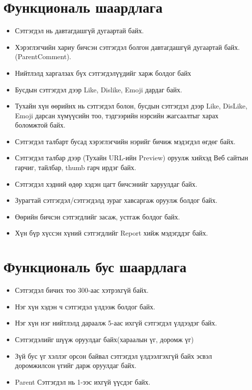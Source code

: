 \documentclass[12pt]{article}
\begin{document}
	\section{Функциональ шаардлага}	
	\begin{itemize}
		\item Сэтгэгдэл нь давтагдашгүй дугаартай байх.
		\item Хэрэглэгчийн хариу бичсэн сэтгэгдэл болгон давтагдашгүй дугаартай байх.(ParentComment).
		\item Нийтлэлд харгалзах бүх сэтгэгдэлүүдийг харж болдог байх
		\item Бусдын сэтгэгдэл дээр Like, Dislike, Emoji дардаг байх.
		\item Тухайн хүн өөрийнх нь сэтгэгдэл болон, бусдын сэтгэгдэл дээр Like, DisLike, Emoji дарсан хүмүүсийн тоо, тэдгээрийн нэрсийн жагсаалтыг харах боломжтой байх.
		\item Сэтгэгдэл талбарт бусад хэрэглэгчийн нэрийг бичиж мэдэгдэл өгдөг байх. 
		\item Сэтгэгдэл талбар дээр (Тухайн URL-ийн Preview) оруулж хийхэд Веб сайтын гарчиг, тайлбар, thumb гарч ирдэг байх.
		\item Сэтгэгдэл хэдний өдөр хэдэн цагт бичсэнийг харуулдаг байх.
		\item Зурагтай сэтгэгдэл/сэтгэгдэлд зураг хавсаргаж оруулж болдог байх.
		\item Өөрийн бичсэн сэтгэгдлийг засаж, устгаж болдог байх.
		\item Хүн бүр хүссэн хүний сэтгэгдлийг Report хийж мэдэгддэг байх.
	\end{itemize}

	\section{Функциональ бус шаардлага}
	\begin{itemize}
		\item Сэтгэгдэл бичих тоо 300-аас хэтрэхгүй байх.
		\item Нэг хүн хэдэн ч сэтгэгдэл үлдээж болдог байх.
		\item Нэг хүн нэг нийтлэлд дараалж 5-аас ихгүй сэтгэгдэл үлдээдэг байх.
		\item Сэтгэгдэлийг шүүж оруулдаг байх(хараалын үг, доромж үг)
		\item Зүй бус үг хэллэг орсон байвал сэтгэгдэл үлдээлгэхгүй байх эсвэл доромжилсон үгийг дарж оруулдаг байх.
		\item Parent Сэтгэгдэл нь 1-ээс ихгүй үүсдэг байх.
	\end{itemize}
	
\end{document}
